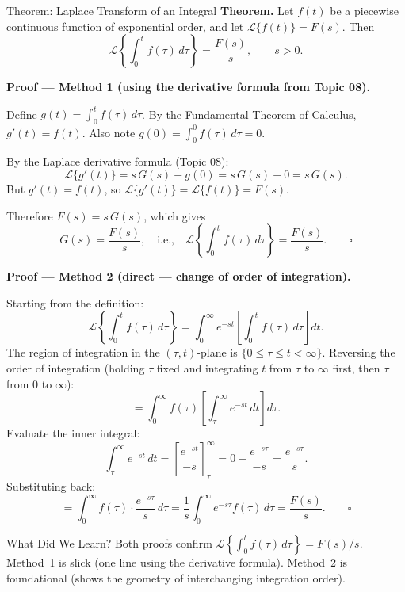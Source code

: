\documentclass[12pt,a4paper]{article}
\begin{document}
\begin{infobox}{Theorem: Laplace Transform of an Integral}
\textbf{Theorem.} Let $f(t)$ be a piecewise continuous function of exponential order,
and let $\mathcal{L}\{f(t)\} = F(s)$. Then
\[
  \mathcal{L}\!\left\{\int_0^t f(\tau)\,d\tau\right\} = \frac{F(s)}{s}, \qquad s > 0.
\]

\bigskip
\noindent\textbf{Proof --- Method 1 (using the derivative formula from Topic 08).}

Define $g(t) = \int_0^t f(\tau)\,d\tau$. By the Fundamental Theorem of Calculus,
$g'(t) = f(t)$. Also note $g(0) = \int_0^0 f(\tau)\,d\tau = 0$.

By the Laplace derivative formula (Topic 08):
\[
  \mathcal{L}\{g'(t)\} = s\,G(s) - g(0) = s\,G(s) - 0 = s\,G(s).
\]
But $g'(t) = f(t)$, so $\mathcal{L}\{g'(t)\} = \mathcal{L}\{f(t)\} = F(s)$.

Therefore $F(s) = s\,G(s)$, which gives
\[
  G(s) = \frac{F(s)}{s}, \quad \text{i.e.,} \quad
  \mathcal{L}\!\left\{\int_0^t f(\tau)\,d\tau\right\} = \frac{F(s)}{s}. \qquad \square
\]

\bigskip
\noindent\textbf{Proof --- Method 2 (direct --- change of order of integration).}

Starting from the definition:
\[
  \mathcal{L}\!\left\{\int_0^t f(\tau)\,d\tau\right\}
  = \int_0^\infty e^{-st}\!\left[\int_0^t f(\tau)\,d\tau\right] dt.
\]
The region of integration in the $(\tau, t)$-plane is $\{0 \leq \tau \leq t < \infty\}$.
Reversing the order of integration (holding $\tau$ fixed and integrating $t$ from $\tau$
to $\infty$ first, then $\tau$ from $0$ to $\infty$):
\[
  = \int_0^\infty f(\tau)\!\left[\int_\tau^\infty e^{-st}\,dt\right] d\tau.
\]
Evaluate the inner integral:
\[
  \int_\tau^\infty e^{-st}\,dt = \left[\frac{e^{-st}}{-s}\right]_\tau^\infty
  = 0 - \frac{e^{-s\tau}}{-s} = \frac{e^{-s\tau}}{s}.
\]
Substituting back:
\[
  = \int_0^\infty f(\tau)\cdot\frac{e^{-s\tau}}{s}\,d\tau
  = \frac{1}{s}\int_0^\infty e^{-s\tau} f(\tau)\,d\tau = \frac{F(s)}{s}. \qquad \square
\]
\end{infobox}

\begin{learnbox}{What Did We Learn?}
Both proofs confirm $\mathcal{L}\!\left\{\int_0^t f(\tau)\,d\tau\right\} = F(s)/s$.
Method~1 is slick (one line using the derivative formula). Method~2 is foundational
(shows the geometry of interchanging integration order).
\end{learnbox}

\end{document}
